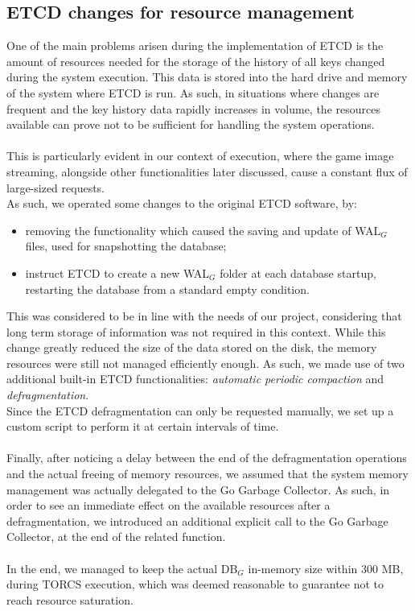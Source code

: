 \subsection{ETCD changes for resource management}\label{etcd-evolution}
One of the main problems arisen during the implementation of ETCD is the amount of resources needed for the storage of the history of all keys changed during the system execution. This data is stored into the hard drive and memory of the system where ETCD is run. As such, in situations where changes are frequent and the key history data rapidly increases in volume, the resources available can prove not to be sufficient for handling the system operations. \\ \\
This is particularly evident in our context of execution, where the game image streaming, alongside other functionalities later discussed, cause a constant flux of large-sized requests. \\
As such, we operated some changes to the original ETCD software, by:
\begin{itemize}
	\item removing the functionality which caused the saving and update of WAL$_G$ files, used for snapshotting the database;
	\item instruct ETCD to create a new WAL$_G$ folder at each database startup, restarting the database from a standard empty condition.
\end{itemize}
This was considered to be in line with the needs of our project, considering that long term storage of information was not required in this context. While this change greatly reduced the size of the data stored on the disk, the memory resources were still not managed efficiently enough. As such, we made use of two additional built-in ETCD functionalities: \textit{automatic periodic compaction} and \textit{defragmentation}. \\
Since the ETCD defragmentation can only be requested manually, we set up a custom script to perform it at certain intervals of time. \\ \\
Finally, after noticing a delay between the end of the defragmentation operations and the actual freeing of memory resources, we assumed that the system memory management was actually delegated to the Go Garbage Collector. As such, in order to see an immediate effect on the available resources after a defragmentation, we introduced an additional explicit call to the Go Garbage Collector, at the end of the related function. \\ \\
In the end, we managed to keep the actual DB$_G$ in-memory size within 300 MB, during TORCS execution, which was deemed reasonable to guarantee not to reach resource saturation.

